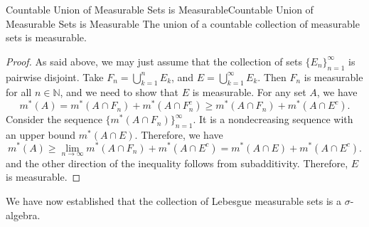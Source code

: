 \documentclass[../main.tex]{subfiles}
\begin{document}
\begin{proposition}{Countable Union of Measurable Sets is Measurable}{Countable Union of Measurable Sets is Measurable}
  The union of a countable collection of measurable sets is measurable.
\end{proposition}
\begin{proof}
  As said above, we may just assume that the collection of sets $\{E_n\}_{n=1}^{\infty}$ is pairwise disjoint. Take $F_n = \bigcup_{k=1}^{n} E_k$, and $E = \bigcup_{k=1}^{\infty} E_k$. Then $F_n$ is measurable for all $n \in \mathbb{N}$, and we need to show that $E$ is measurable. For any set $A$, we have
  \begin{equation}
    m^*(A) = m^*(A \cap F_n) + m^*(A \cap F_n^c) \geq m^*(A \cap F_n) + m^*(A \cap E^c).
  \end{equation}
  Consider the sequence $\{m^*(A \cap F_n)\}_{n=1}^{\infty}$. It is a nondecreasing sequence with an upper bound $m^*(A\cap E)$. Therefore, we have
  \begin{equation}
    m^*(A) \geq \lim_{n \to \infty} m^*(A \cap F_n) + m^*(A \cap E^c) = m^*(A \cap E) + m^*(A \cap E^c).
  \end{equation}
  and the other direction of the inequality follows from subadditivity. Therefore, $E$ is measurable.
\end{proof}

We have now established that the collection of Lebesgue measurable sets is a $\sigma$-algebra.
\end{document}
